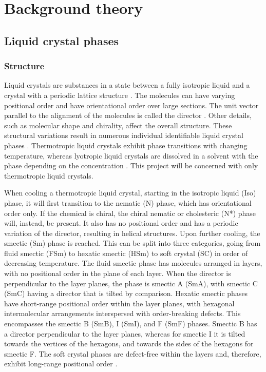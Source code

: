 \documentclass[12pt]{article}
\begin{document}
\section{Background theory}
\subsection{Liquid crystal phases}
\subsubsection{Structure}
Liquid crystals are substances in a state between a fully isotropic liquid and a crystal with a periodic lattice structure \cite{Demus99, Dierking03}. The molecules can have varying positional order and have orientational order over large sections. The unit vector parallel to the alignment of the molecules is called the director \cite{Demus99, Dierking03}. Other details, such as molecular shape and chirality, affect the overall structure. These structural variations result in numerous individual identifiable liquid crystal phases \cite{Demus99, Dierking03}. Thermotropic liquid crystals exhibit phase transitions with changing temperature, whereas lyotropic liquid crystals are dissolved in a solvent with the phase depending on the concentration \cite{Demus99}. This project will be concerned with only thermotropic liquid crystals. 

When cooling a thermotropic liquid crystal, starting in the isotropic liquid (Iso) phase, it will first transition to the nematic (N) phase, which has orientational order only. If the chemical is chiral, the chiral nematic or cholesteric (N*) phase will, instead, be present. It also has no positional order and has a periodic variation of the director, resulting in helical structures. Upon further cooling, the smectic (Sm) phase is reached. This can be split into three categories, going from fluid smectic (FSm) to hexatic smectic (HSm) to soft crystal (SC) in order of decreasing temperature. The fluid smectic phase has molecules arranged in layers, with no positional order in the plane of each layer. When the director is perpendicular to the layer planes, the phase is smectic A (SmA), with smectic C (SmC) having a director that is tilted by comparison. Hexatic smectic phases have short-range positional order within the layer planes, with hexagonal intermolecular arrangements interspersed with order-breaking defects. This encompasses the smectic B (SmB), I (SmI), and F (SmF) phases. Smectic B has a director perpendicular to the layer planes, whereas for smectic I it is tilted towards the vertices of the hexagons, and towards the sides of the hexagons for smectic F. The soft crystal phases are defect-free within the layers and, therefore, exhibit long-range positional order \cite{Dierking03}.
\end{document}
